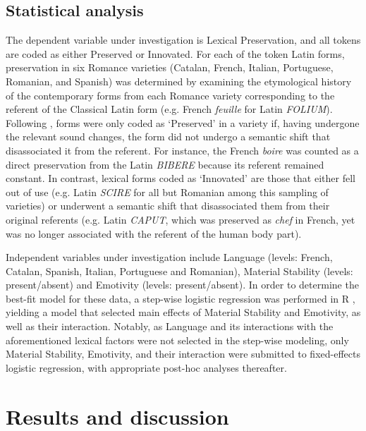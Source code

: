 \documentclass[output=paper,colorlinks,citecolor=brown,
]{langscibook}
\begin{document}
\subsection{Statistical analysis}
The dependent variable under investigation is Lexical Preservation, and all tokens are coded as either Preserved or Innovated. For each of the token Latin forms, preservation in six Romance varieties (Catalan, French, Italian, Portuguese, Romanian, and Spanish) was determined by examining the etymological history of the contemporary forms from each Romance variety corresponding to the referent of the Classical Latin form (e.g. French \textit{feuille} for Latin \textit{FOLIUM}). Following \citet[565]{stefenelli_lexical_2011}, forms were only coded as ‘Preserved’ in a variety if, having undergone the relevant sound changes, the form did not undergo a semantic shift that disassociated it from the referent. For instance, the French \textit{boire} was counted as a direct preservation from the Latin \textit{BIBERE} because its referent remained constant. In contrast, lexical forms coded as ‘Innovated’ are those that either fell out of use (e.g. Latin \textit{SCIRE} for all but Romanian among this sampling of varieties) or underwent a semantic shift that disassociated them from their original referents (e.g. Latin \textit{CAPUT}, which was preserved as \textit{chef} in French, yet was no longer associated with the referent of the human body part).

Independent variables under investigation include Language (levels: French, Catalan, Spanish, Italian, Portuguese and Romanian), Material Stability (levels: present/absent) and Emotivity (levels: present/absent). In order to determine the best-fit model for these data, a step-wise logistic regression was performed in R \citep{r_core_team_r_2019}, yielding a model that selected main effects of Material Stability and Emotivity, as well as their interaction. Notably, as Language and its interactions with the aforementioned lexical factors were not selected in the step-wise modeling, only Material Stability, Emotivity, and their interaction were submitted to fixed-effects logistic regression, with appropriate post-hoc analyses thereafter.

\section{Results and discussion}
\end{document}
